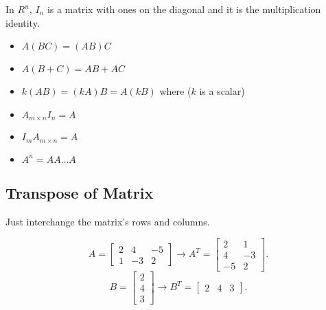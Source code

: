 \documentclass{article}
\begin{document}
\begin{note}
    In $R^n$, $I_n$ is a matrix with ones on the diagonal and it is the multiplication identity.
\end{note}

\begin{itemize}
    \item $A(BC)=(AB)C$
    \item $A(B+C)=AB+AC$
    \item $k(AB)=(kA)B=A(kB)$ where ($k$ is a scalar)
    \item $A_{m\times n}I_n=A$
    \item $I_mA_{m\times n}=A$
    \item $A^n= A A \ldots A$
\end{itemize}

\subsection{Transpose of Matrix}

\begin{definition}
    Just interchange the matrix's rows and columns.
\end{definition}

\begin{example}
    \[
        A = \begin{bmatrix} 2&4&-5\\1&-3&2 \end{bmatrix} 
        \longrightarrow
        A^T=\begin{bmatrix} 2&1\\4&-3\\-5&2 \end{bmatrix} 
    .\] 
    \[
        B = \begin{bmatrix} 2\\4\\3 \end{bmatrix} 
        \longrightarrow
        B^T=\begin{bmatrix} 2&4&3 \end{bmatrix} 
    .\] 
\end{example}
\end{document}
